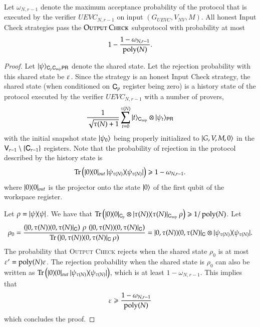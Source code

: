 

\begin{theorem}	
\label{thm:output_check}
Let $\omega_{N,r-1}$ denote the maximum acceptance probability of the protocol that is executed by the verifier $UEVC_{N,r-1}$ on input $(G_{UEVC},V_{NV},M)$. All honest Input Check strategies pass the $\textsc{Output Check}$ subprotocol with probability at most 
\[
	1 - \frac{1 - \omega_{N,r-1}}{\operatorname{poly}(N)}.
\] 
\end{theorem}
\begin{proof}
Let $|\psi\rangle_{{\mathsf{C}}_p {\mathsf{C}}_{mip} {\mathsf{P}} {\mathsf{R}}}$ denote the shared state. Let the rejection probability with this shared state be $\varepsilon$. Since the strategy is an honest Input Check strategy, the shared state (when conditioned on ${\mathsf{C}}_p$ register being zero) is a history state of the protocol executed by the verifier $UEVC_{N,r-1}$ with a number of provers,
\[
\frac{1}{\sqrt{\tau(N) + 1}} \sum_{t = 0}^{\tau(N)} |t\rangle_{{\mathsf{C}}_{mip}} \otimes |\psi_t\rangle_{{\mathsf{P}} {\mathsf{R}}}
\]
with the initial snapshot state $|\psi_0\rangle$ being properly initialized to $|G,V,M,0\rangle$ in the ${\mathsf{V}}_{r-1} \setminus \{ {\mathsf{C}}_{r-1} \}$ registers. Note that the probability of rejection in the protocol described by the history state is 
\[
	\operatorname{Tr} \left ( |0\rangle\! \langle 0|_{out} \, |\psi_{\tau(N)}\rangle\! \langle \psi_{\tau(N)}| \right) \geqslant 1 - \omega_{N,r-1}.
\]
where $|0\rangle\! \langle 0|_{out}$ is the projector onto the state $|0\rangle$ of the first qubit of the workspace register.

Let $\rho = |\psi\rangle\! \langle \psi|$. We have that $\operatorname{Tr} \left (  |0\rangle\! \langle 0|_{{\mathsf{C}}_p} \otimes |\tau(N)\rangle\! \langle \tau(N)|_{{\mathsf{C}}_{mip}} \, \rho \right) \geqslant 1/\operatorname{poly}(N)$. Let
\[
\rho_0 = \frac{\left (|0,\tau(N)\rangle\! \langle 0,\tau(N)|_{{\mathsf{C}}} \right) \, \rho \, \left ( |0,\tau(N)\rangle\! \langle 0,\tau(N)|_{{\mathsf{C}}} \right)}{\operatorname{Tr} \left (  |0,\tau(N)\rangle\! \langle 0,\tau(N)|_{{\mathsf{C}}}\, \rho \right)} = |0,\tau(N)\rangle\! \langle 0,\tau(N)|_{{\mathsf{C}}} \otimes |\psi_{\tau(N)}\rangle\! \langle \psi_{\tau(N)}|.
\]
The probability that \textsc{Output Check} rejects when the shared state $\rho_0$ is at most $\varepsilon' = \operatorname{poly}(N) \varepsilon$. The rejection probability when the shared state is $\rho_0$ can also be written as $\operatorname{Tr} \left ( |0\rangle\! \langle 0|_{out} \, |\psi_{\tau(N)}\rangle\! \langle \psi_{\tau(N)}| \right)$, which is at least $1 - \omega_{N,r-1}$. This implies that
\[
	\varepsilon \geqslant \frac{1 - \omega_{N,r-1}}{\operatorname{poly}(N)}
\]
which concludes the proof.
\end{proof}



